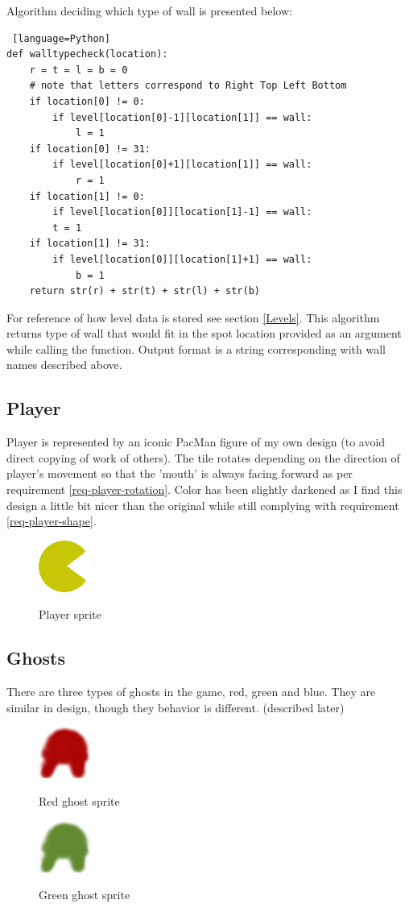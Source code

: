 \documentclass[11pt,a4paper]{report}
\newcommand{\dsubsection}[1]{\FloatBarrier \subsection{#1}}
\newenvironment{img}{
	\begin{center}
		\begin{figure}[H]
			\begin{center}
			
}{
	\end{center}
		\end{figure}
			\end{center}
}
\begin{document}
				Algorithm deciding which type of wall is presented below:
				\label{walltypecheck}
				\begin{lstlisting} [language=Python]
def walltypecheck(location):
	r = t = l = b = 0
	# note that letters correspond to Right Top Left Bottom
	if location[0] != 0:
		if level[location[0]-1][location[1]] == wall:
			l = 1
	if location[0] != 31:
		if level[location[0]+1][location[1]] == wall:
			r = 1
	if location[1] != 0:
		if level[location[0]][location[1]-1] == wall:
		t = 1
	if location[1] != 31:
		if level[location[0]][location[1]+1] == wall:
			b = 1
	return str(r) + str(t) + str(l) + str(b)
				\end{lstlisting}
				For reference of how level data is stored see section \ref{Levels}.
				This algorithm returns type of wall that would fit in the spot location provided as an argument while calling the function. Output format is a string corresponding with wall names described above.
			\dsubsection{Player}
				Player is represented by an iconic PacMan figure of my own design (to avoid direct copying of work of others). The tile rotates depending on the direction of player's movement so that the 'mouth' is always facing forward as per requirement \ref{req-player-rotation}. Color has been slightly darkened as I find this design a little bit nicer than the original while still complying with requirement \ref{req-player-shape}. 
				\begin{img}
					\includegraphics{images/player}\\
				\caption{Player sprite}
				\end{img}
			\dsubsection{Ghosts}
				There are three types of ghosts in the game, red, green and blue. They are similar in design, though they behavior is different. (described later)
				 \begin{img}
				 	\includegraphics{images/redghost}\\
				 	\caption{Red ghost sprite}
				 	\label{ghostimage}
				 \end{img}
				  \begin{img}
				 	\includegraphics{images/greenghost}\\
				 	\caption{Green ghost sprite}
				 \end{img}
\end{document}
